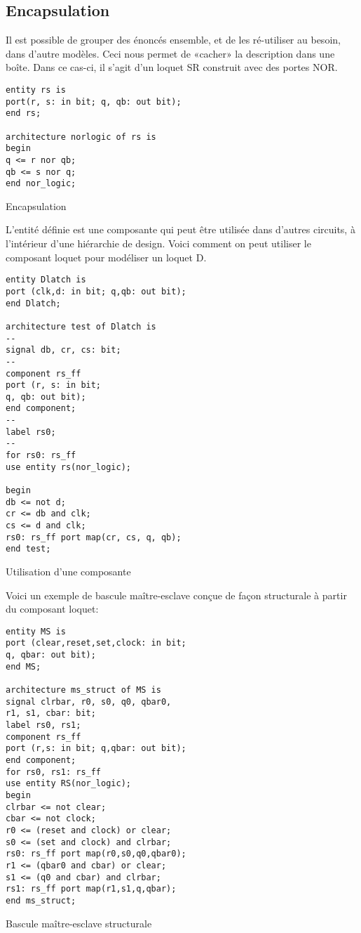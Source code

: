 \documentclass[11pt]{article}
\begin{document}
\subsection{Encapsulation}
\label{sec:orgb15b827}

Il est possible de grouper des énoncés ensemble, et de les ré-utiliser
au besoin, dans d'autre modèles. Ceci nous permet de «cacher» la
description dans une boîte. Dans ce cas-ci, il s'agit d'un loquet SR
construit avec des portes NOR.

\begin{listing}[htbp]
\begin{verbatim}
entity rs is
port(r, s: in bit; q, qb: out bit);
end rs;

architecture norlogic of rs is
begin
q <= r nor qb;
qb <= s nor q;
end nor_logic;
\end{verbatim}
\caption{Encapsulation}
\end{listing}

L'entité définie est une composante qui peut être utilisée dans
d'autres circuits, à l'intérieur d'une hiérarchie de design. Voici
comment on peut utiliser le composant loquet pour modéliser un loquet D.

\begin{listing}[htbp]
\begin{verbatim}
entity Dlatch is
port (clk,d: in bit; q,qb: out bit);
end Dlatch;

architecture test of Dlatch is
--
signal db, cr, cs: bit;
--
component rs_ff
port (r, s: in bit;
q, qb: out bit);
end component;
--
label rs0;
--
for rs0: rs_ff
use entity rs(nor_logic);

begin
db <= not d;
cr <= db and clk;
cs <= d and clk;
rs0: rs_ff port map(cr, cs, q, qb);
end test;
\end{verbatim}
\caption{Utilisation d'une composante}
\end{listing}

Voici un exemple de bascule maître-esclave conçue de façon structurale
à partir du composant loquet:

\begin{listing}[htbp]
\begin{verbatim}
entity MS is
port (clear,reset,set,clock: in bit;
q, qbar: out bit);
end MS;

architecture ms_struct of MS is
signal clrbar, r0, s0, q0, qbar0,
r1, s1, cbar: bit;
label rs0, rs1;
component rs_ff
port (r,s: in bit; q,qbar: out bit);
end component;
for rs0, rs1: rs_ff
use entity RS(nor_logic);
begin
clrbar <= not clear;
cbar <= not clock;
r0 <= (reset and clock) or clear;
s0 <= (set and clock) and clrbar;
rs0: rs_ff port map(r0,s0,q0,qbar0);
r1 <= (qbar0 and cbar) or clear;
s1 <= (q0 and cbar) and clrbar;
rs1: rs_ff port map(r1,s1,q,qbar);
end ms_struct;
\end{verbatim}
\caption{Bascule maître-esclave structurale}
\end{listing}
\end{document}
